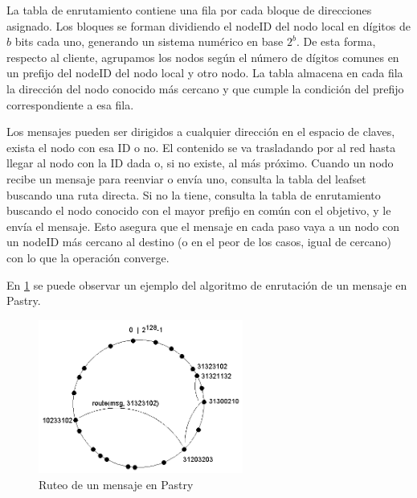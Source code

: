 La tabla de enrutamiento contiene una fila por cada bloque de direcciones
asignado. Los bloques se forman dividiendo el nodeID del nodo local en dígitos
de $b$ bits cada uno, generando un sistema numérico en base $2^b$. De esta forma, respecto al cliente,
agrupamos los nodos según el número de dígitos comunes en un prefijo del nodeID
del nodo local y otro nodo. La tabla almacena en cada fila la dirección del nodo conocido más
cercano y que cumple la condición del prefijo correspondiente a esa fila.

Los mensajes pueden ser dirigidos a cualquier dirección en el espacio de
claves, exista el nodo con esa ID o no. El contenido se va trasladando por al red hasta llegar al
nodo con la ID dada o, si no existe, al más próximo. Cuando un nodo recibe un mensaje para
reenviar o envía uno, consulta la tabla del leafset buscando una ruta directa. Si no la
tiene, consulta la tabla de enrutamiento buscando el nodo conocido con el mayor prefijo en
común con el objetivo, y le envía el mensaje. Esto asegura que el mensaje en cada paso vaya
a un nodo con un nodeID más cercano al destino (o en el peor de los casos, igual de cercano)
con lo que la operación converge.



 En \ref{fig:p2p_pastry_routing} se puede
observar un ejemplo del algoritmo de enrutación de un mensaje en Pastry.

\begin{figure}
\center
\includegraphics[width=0.6\textwidth]{img/pastryrouting}
\caption{Ruteo de un mensaje en Pastry}
\label{fig:p2p_pastry_routing}
\end{figure}


